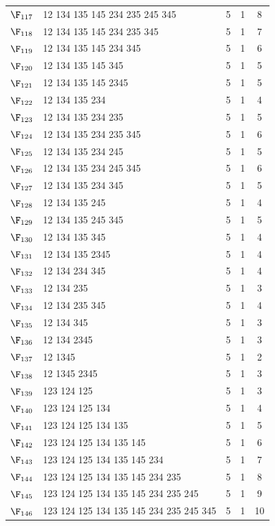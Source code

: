{\begin{longtable}{c p{7cm} c c c}
$\F_{117}$ & 12 134 135 145 234 235 245 345 & 5 & 1 & 8 \\
$\F_{118}$ & 12 134 135 145 234 235 345 & 5 & 1 & 7 \\
$\F_{119}$ & 12 134 135 145 234 345 & 5 & 1 & 6 \\
$\F_{120}$ & 12 134 135 145 345 & 5 & 1 & 5 \\
$\F_{121}$ & 12 134 135 145 2345 & 5 & 1 & 5 \\
$\F_{122}$ & 12 134 135 234 & 5 & 1 & 4 \\
$\F_{123}$ & 12 134 135 234 235 & 5 & 1 & 5 \\
$\F_{124}$ & 12 134 135 234 235 345 & 5 & 1 & 6 \\
$\F_{125}$ & 12 134 135 234 245 & 5 & 1 & 5 \\
$\F_{126}$ & 12 134 135 234 245 345 & 5 & 1 & 6 \\
$\F_{127}$ & 12 134 135 234 345 & 5 & 1 & 5 \\
$\F_{128}$ & 12 134 135 245 & 5 & 1 & 4 \\
$\F_{129}$ & 12 134 135 245 345 & 5 & 1 & 5 \\
$\F_{130}$ & 12 134 135 345 & 5 & 1 & 4 \\
$\F_{131}$ & 12 134 135 2345 & 5 & 1 & 4 \\
$\F_{132}$ & 12 134 234 345 & 5 & 1 & 4 \\
$\F_{133}$ & 12 134 235 & 5 & 1 & 3 \\
$\F_{134}$ & 12 134 235 345 & 5 & 1 & 4 \\
$\F_{135}$ & 12 134 345 & 5 & 1 & 3 \\
$\F_{136}$ & 12 134 2345 & 5 & 1 & 3 \\
$\F_{137}$ & 12 1345 & 5 & 1 & 2 \\
$\F_{138}$ & 12 1345 2345 & 5 & 1 & 3 \\
$\F_{139}$ & 123 124 125 & 5 & 1 & 3 \\
$\F_{140}$ & 123 124 125 134 & 5 & 1 & 4 \\
$\F_{141}$ & 123 124 125 134 135 & 5 & 1 & 5 \\
$\F_{142}$ & 123 124 125 134 135 145 & 5 & 1 & 6 \\
$\F_{143}$ & 123 124 125 134 135 145 234 & 5 & 1 & 7 \\
$\F_{144}$ & 123 124 125 134 135 145 234 235 & 5 & 1 & 8 \\
$\F_{145}$ & 123 124 125 134 135 145 234 235 245 & 5 & 1 & 9 \\
$\F_{146}$ & 123 124 125 134 135 145 234 235 245 345 & 5 & 1 & 10 \\

\end{longtable}}
